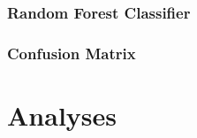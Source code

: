 \documentclass{article}
\begin{document}
		\subsubsection{Random Forest Classifier}
		\subsubsection{Confusion Matrix}
		\subsubsection{}
		
	\subsection{}

\section{Analyses}
\subsection{}


 
\end{document}
